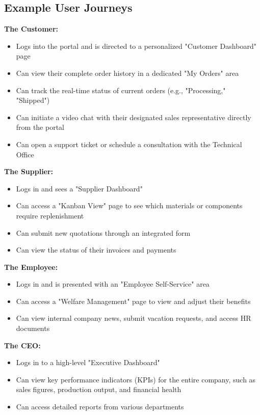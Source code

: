 \subsection{Example User Journeys}

\textbf{The Customer:}
\begin{itemize}
	\item Logs into the portal and is directed to a personalized "Customer Dashboard" page
	\item Can view their complete order history in a dedicated "My Orders" area
	\item Can track the real-time status of current orders (e.g., "Processing," "Shipped")
	\item Can initiate a video chat with their designated sales representative directly from the portal
	\item Can open a support ticket or schedule a consultation with the Technical Office
\end{itemize}

\textbf{The Supplier:}
\begin{itemize}
	\item Logs in and sees a "Supplier Dashboard"
	\item Can access a "Kanban View" page to see which materials or components require replenishment
	\item Can submit new quotations through an integrated form
	\item Can view the status of their invoices and payments
\end{itemize}

\textbf{The Employee:}
\begin{itemize}
	\item Logs in and is presented with an "Employee Self-Service" area
	\item Can access a "Welfare Management" page to view and adjust their benefits
	\item Can view internal company news, submit vacation requests, and access HR documents
\end{itemize}

\textbf{The CEO:}
\begin{itemize}
	\item Logs in to a high-level "Executive Dashboard"
	\item Can view key performance indicators (KPIs) for the entire company, such as sales figures, production output, and financial health
	\item Can access detailed reports from various departments
\end{itemize}

